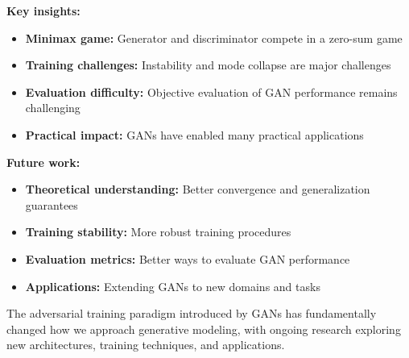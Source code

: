 \textbf{Key insights:}
\begin{itemize}
    \item \textbf{Minimax game:} Generator and discriminator compete in a zero-sum game
    \item \textbf{Training challenges:} Instability and mode collapse are major challenges
    \item \textbf{Evaluation difficulty:} Objective evaluation of GAN performance remains challenging
    \item \textbf{Practical impact:} GANs have enabled many practical applications
\end{itemize}

\textbf{Future work:}
\begin{itemize}
    \item \textbf{Theoretical understanding:} Better convergence and generalization guarantees
    \item \textbf{Training stability:} More robust training procedures
    \item \textbf{Evaluation metrics:} Better ways to evaluate GAN performance
    \item \textbf{Applications:} Extending GANs to new domains and tasks
\end{itemize}

The adversarial training paradigm introduced by GANs has fundamentally changed how we approach generative modeling, with ongoing research exploring new architectures, training techniques, and applications.
